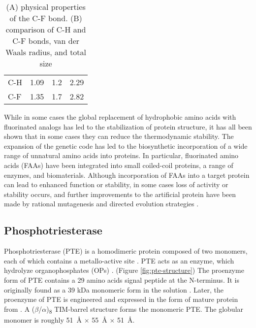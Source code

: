 \begin{refsection}
\begin{table}[h!]
\begin{tabular}{ llll }
  C-H & 1.09 & 1.2 & 2.29 \\
  C-F & 1.35 & 1.7 & 2.82 \\

  \hline
\end{tabular}
\caption[(A) physical properties of the C-F bond. (B) comparison of C-H and C-F
bonds, van der Waals radius, and total size]{(A) physical properties of the C-F
bond. (B) comparison of C-H and C-F bonds, van der Waals radius, and total
size\cite{Tang2001,Odar2015}}
\label{tab:c-fbond}
\end{table}

While in some cases the global replacement
of hydrophobic amino acids with fluorinated analogs has led to the
stabilization of protein structure\cite{Biffinger2004}, it has all been shown
that in some cases they can reduce the thermodynamic
stability\cite{Panchenko2006b}. The expansion of the genetic code has led to
the biosynthetic incorporation of a wide range of unnatural amino acids into
proteins\cite{Voloshchuk2010}. In particular, fluorinated amino acids (FAAs)
have been integrated into small coiled-coil
proteins\cite{Montclare2009b,Tang2001}, a range of
enzymes\cite{Voloshchuk2009,Panchenko2006b,Voloshchuk2007b,Mehta2011a,Hammill2007},
and biomaterials\cite{Yuvienco2012b}. Although incorporation of FAAs into a
target protein can lead to enhanced function or stability, in some cases loss
of activity or stability occurs, and further improvements to the artificial
protein have been made by rational mutagenesis \cite{Voloshchuk2007b} and
directed evolution strategies \cite{Montclare2006b}.

\subsection{Phosphotriesterase} 
\label{sec:pte-intro}

Phosphotriesterase (PTE) is a homodimeric protein composed of two monomers,
each of which contains a metallo-active site
\cite{Aubert2004b,Benning2001a,Benning1995}. PTE acts as an enzyme, which
hydrolyze organophosphates (OPs) \cite{Ghanem2005a}.  (Figure
\ref{fig:pte-structure}) The proenzyme form of PTE contains a 29 amino acids
signal peptide at the N-terminus. It is originally found as a 39 kDa monomeric
form in the solution \cite{Mulbry1989}. Later, the proenzyme of PTE is
engineered and expressed in the form of mature protein from . A
($\beta$/$\alpha$)\textsubscript{8} TIM-barrel structure forms the monomeric
PTE\cite{Roodveldt2005,Seibert2005}. The globular monomer is roughly \SI{51}{\angstrom}
$\times$ \SI{55}{\angstrom} $\times$ \SI{51}{\angstrom}.


\end{refsection}
